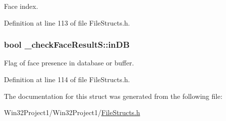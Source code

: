 Face index. 



Definition at line 113 of file File\+Structs.\+h.

\subsubsection[{\texorpdfstring{in\+DB}{inDB}}]{\setlength{\rightskip}{0pt plus 5cm}bool \+\_\+check\+Face\+Result\+S\+::in\+DB}\hypertarget{struct__check_face_result_s_aa7353d6109af6ce0a9b2c8c07e09a48b}{}\label{struct__check_face_result_s_aa7353d6109af6ce0a9b2c8c07e09a48b}


Flag of face presence in database or buffer. 



Definition at line 114 of file File\+Structs.\+h.



The documentation for this struct was generated from the following file\+:\begin{DoxyCompactItemize}
\item 
Win32\+Project1/\+Win32\+Project1/\hyperlink{_file_structs_8h}{File\+Structs.\+h}\end{DoxyCompactItemize}

